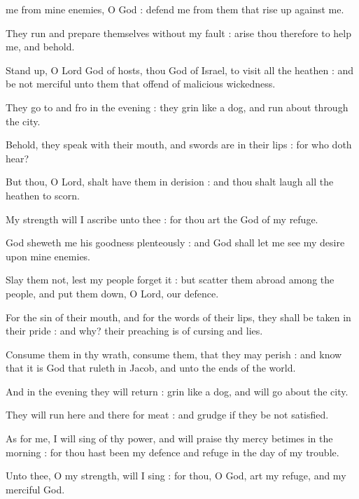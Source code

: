  me from mine enemies, O God : defend me from them that rise up against me.\par
{}
They run and prepare themselves without my fault : arise thou therefore to help me, and behold.\par
{}Stand up, O Lord God of hosts, thou God of Israel, to visit all the heathen : and be not merciful unto them that offend of malicious wickedness.\par
{}They go to and fro in the evening : they grin like a dog, and run about through the city.\par
{}Behold, they speak with their mouth, and swords are in their lips : for who doth hear?\par
{}But thou, O Lord, shalt have them in derision : and thou shalt laugh all the heathen to scorn.\par
{}My strength will I ascribe unto thee : for thou art the God of my refuge.\par
{}God sheweth me his goodness plenteously : and God shall let me see my desire upon mine enemies.\par
{}Slay them not, lest my people forget it : but scatter them abroad among the people, and put them down, O Lord, our defence.\par
{}For the sin of their mouth, and for the words of their lips, they shall be taken in their pride : and why? their preaching is of cursing and lies.\par
{}Consume them in thy wrath, consume them, that they may perish : and know that it is God that ruleth in Jacob, and unto the ends of the world.\par
{}And in the evening they will return : grin like a dog, and will go about the city.\par
{}They will run here and there for meat : and grudge if they be not satisfied.\par
{}As for me, I will sing of thy power, and will praise thy mercy betimes in the morning : for thou hast been my defence and refuge in the day of my trouble.\par
{}Unto thee, O my strength, will I sing : for thou, O God, art my refuge, and my merciful God.\par

